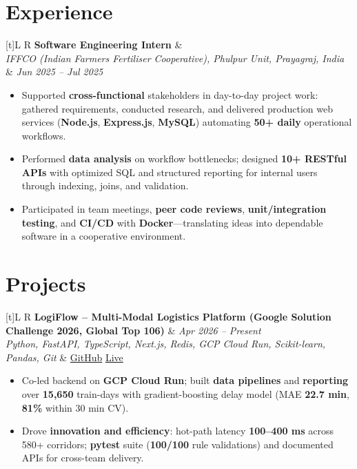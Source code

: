 \documentclass[a4paper,10pt]{article}
\newcommand{\resumeSubheading}[4]{
  \vspace{0.5mm}
  \noindent
  \begin{tabularx}{\textwidth}[t]{L R}
    \textbf{#1} & #4 \\
    \textit{#3} & \textit{#2} \\
  \end{tabularx}
  \vspace{-0.5mm}
}
\newcommand{\resumeProject}[4]{
  \vspace{0.5mm}
  \noindent
  \begin{tabularx}{\textwidth}[t]{L R}
    \textbf{#1} & \textit{#3} \\
    \textit{#2} & #4 \\
  \end{tabularx}
  \vspace{-0.5mm}
}
\begin{document}
\section{Experience}
\small
\resumeSubheading
  {Software Engineering Intern}{Jun 2025 -- Jul 2025}
  {IFFCO (Indian Farmers Fertiliser Cooperative), Phulpur Unit, Prayagraj, India}{}
\begin{itemize}
  \item Supported \textbf{cross-functional} stakeholders in day-to-day project work: gathered requirements, conducted research, and delivered production web services (\textbf{Node.js}, \textbf{Express.js}, \textbf{MySQL}) automating \textbf{50+ daily} operational workflows.
  \item Performed \textbf{data analysis} on workflow bottlenecks; designed \textbf{10+ RESTful APIs} with optimized SQL and structured reporting for internal users through indexing, joins, and validation.
  \item Participated in team meetings, \textbf{peer code reviews}, \textbf{unit/integration testing}, and \textbf{CI/CD} with \textbf{Docker}---translating ideas into dependable software in a cooperative environment.
\end{itemize}

\section{Projects}
\small

\resumeProject
  {LogiFlow -- Multi-Modal Logistics Platform (Google Solution Challenge 2026, Global Top 106)}
  {Python, FastAPI, TypeScript, Next.js, Redis, GCP Cloud Run, Scikit-learn, Pandas, Git}
  {Apr 2026 -- Present}
  {\href{https://github.com/Ojas-Srivastava05/LogiFlow-Solution-Challenge-2026}{GitHub} \textbar{} \href{https://logi-flow-solution-challenge-2026.vercel.app/}{Live}}
\begin{itemize}
  \item Co-led backend on \textbf{GCP Cloud Run}; built \textbf{data pipelines} and \textbf{reporting} over \textbf{15,650} train-days with gradient-boosting delay model (MAE \textbf{22.7 min}, \textbf{81\%} within 30 min CV).
  \item Drove \textbf{innovation and efficiency}: hot-path latency \textbf{100--400 ms} across 580+ corridors; \textbf{pytest} suite (\textbf{100/100} rule validations) and documented APIs for cross-team delivery.
\end{itemize}
\end{document}
